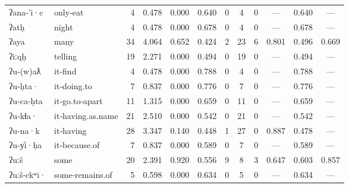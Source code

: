 \begin{landscape}
\begin{longtable}[c]{ l l | r r c c | c c c | c c c }
  ʔana‑'i·c          & only‑eat                  & 4   & 0.478                     & 0.000           & 0.640      & 0         & 4           & 0            & —         & 0.640       & —\\
  ʔatḥ               & night                     & 4   & 0.478                     & 0.000           & 0.678      & 0         & 4           & 0            & —         & 0.678       & —\\
  ʔaya               & many                      & 34  & 4.064                     & 0.652           & 0.424      & 2         & 23          & 6            & 0.801     & 0.496       & 0.669\\
  ʔiːqḥ              & telling                   & 19  & 2.271                     & 0.000           & 0.494      & 0         & 19          & 0            & —         & 0.494       & —\\
  ʔu‑(w)aƛ           & it‑find                   & 4   & 0.478                     & 0.000           & 0.788      & 0         & 4           & 0            & —         & 0.788       & —\\
  ʔu‑ḥta·            & it‑doing.to               & 7   & 0.837                     & 0.000           & 0.776      & 0         & 7           & 0            & —         & 0.776       & —\\
  ʔu‑ca‑ḥta          & it‑go.to‑apart            & 11  & 1.315                     & 0.000           & 0.659      & 0         & 11          & 0            & —         & 0.659       & —\\
  ʔu‑kɬa·            & it‑having.as.name         & 21  & 2.510                     & 0.000           & 0.542      & 0         & 21          & 0            & —         & 0.542       & —\\
  ʔu‑na·k            & it‑having                 & 28  & 3.347                     & 0.140           & 0.448      & 1         & 27          & 0            & 0.887     & 0.478       & —\\
  ʔu‑y̓i·ḥa           & it‑because.of             & 7   & 0.837                     & 0.000           & 0.589      & 0         & 7           & 0            & —         & 0.589       & —\\
  ʔuːš               & some                      & 20  & 2.391                     & 0.920           & 0.556      & 9         & 8           & 3            & 0.647     & 0.603       & 0.857\\
  ʔuːš‑ckʷi·         & some‑remains.of           & 5   & 0.598                     & 0.000           & 0.634      & 0         & 5           & 0            & —         & 0.634       & —\\

\end{longtable}
\end{landscape}
